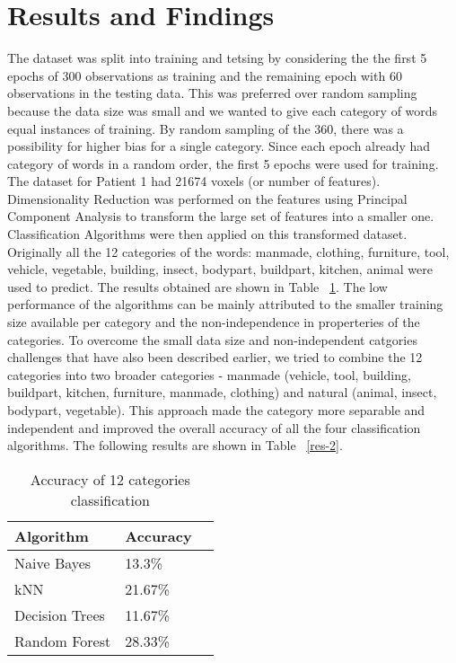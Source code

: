 \documentclass{article}
\begin{document}
\section{Results and Findings}

The dataset was split into training and tetsing by considering the the first 5 epochs of 300 observations as training and the remaining epoch with 60 observations in
the testing data. This was preferred over random sampling because the data size was small and we wanted to give each category of words equal instances of training. By random sampling of the 360, there was a possibility for higher bias for a 
single category. Since each epoch already had category of words in a random order, the first 5 epochs were used for training.
The dataset for Patient 1 had 21674 voxels (or number of features). Dimensionality Reduction was performed on the features using Principal Component Analysis to transform the large set of features into a smaller one.
Classification Algorithms were then applied on this transformed dataset. Originally all the 12 categories of the words: manmade, clothing, furniture, tool, vehicle, vegetable, building, insect, bodypart, buildpart, kitchen, animal were used to predict.
The results obtained are shown in Table ~\ref{res-1}. The low performance of the algorithms can be mainly attributed to the smaller training size available per category and the non-independence in properteries of the categories.
To overcome the small data size and non-independent catgories challenges that have also been described earlier, 
we tried to combine the 12 categories into two broader categories - manmade (vehicle, tool, building, buildpart, kitchen, furniture, manmade, clothing) and natural (animal, insect, bodypart, vegetable). 
This approach made the category more separable and independent and improved the overall accuracy of all the four classification algorithms.
The following results are shown in Table ~\ref{res-2}.

\begin{table}
  \caption{Accuracy of 12 categories classification}
  \label{res-1}
  \centering
  \begin{tabular}{lll}
    \toprule
    Algorithm & Accuracy \\
    \midrule
    Naive Bayes & 13.3\% \\
    kNN & 21.67\% \\
    Decision Trees & 11.67\% \\
    Random Forest & 28.33\%  \\
    \bottomrule
  \end{tabular}
\end{table}
\end{document}
